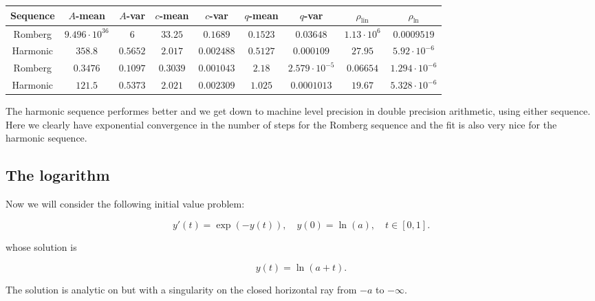 \begin{table}[H]
    \centering
    \small
    \begin{tabular}{c||c|c|c|c|c|c|c|c}
Sequence & \(A\)-mean & \(A\)-var & \(c\)-mean & \(c\)-var & \(q\)-mean & \(q\)-var & \(\rho_{\operatorname{lin}}\) & \(\rho_{\ln}\)\\\hline
\rowcolor{red}
Romberg & \(9.496\cdot 10^{36}\) & \(6\) & \(33.25\) & \(0.1689\) & \(0.1523\) & \(0.03648\) & \(1.13\cdot 10^6\) & \(0.0009519\) \\
\rowcolor{green}
Harmonic & \(358.8\) & \(0.5652\) & \(2.017\) & \(0.002488\) & \(0.5127\) & \(0.000109\) & \(27.95\) & \(5.92\cdot 10^{-6}\) \\
\rowcolor{green}
Romberg & \(0.3476\) & \(0.1097\) & \(0.3039\) & \(0.001043\) & \(2.18\) & \(2.579\cdot 10^{-5}\) & \(0.06654\) & \(1.294\cdot 10^{-6}\) \\
\rowcolor{green}
Harmonic & \(121.5\) & \(0.5373\) & \(2.021\) & \(0.002309\) & \(1.025\) & \(0.0001013\) & \(19.67\) & \(5.328\cdot 10^{-6}\) \\
    \end{tabular}
    \label{tab:my_label}
\end{table}

The harmonic sequence performes better and we get down to machine level precision in double precision arithmetic, using either sequence.\\

Here we clearly have exponential convergence in the number of steps for the Romberg sequence and the fit is also very nice for the harmonic sequence.

\subsection{The logarithm}

Now we will consider the following initial value problem:

\begin{equation}
y'(t) = \exp(-y(t)), \quad y(0) = \ln(a), \quad t\in [0,1].
\end{equation}

whose solution is 

\[
y(t) = \ln(a + t).
\]

The solution is analytic on but with a singularity on the closed horizontal ray from \(-a\) to \(-\infty\).

